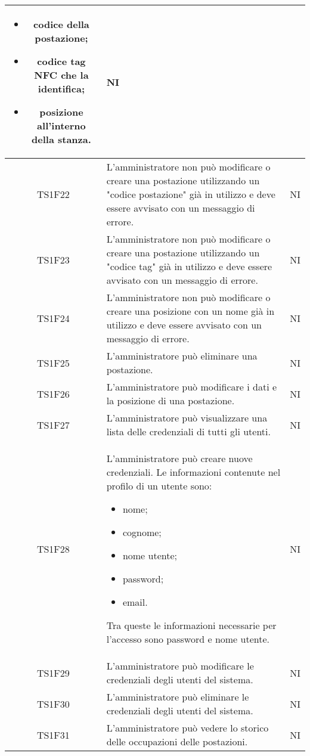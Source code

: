 \begin{center}
\begin{longtable}{|c|p{10cm}|c|}
			\begin{itemize}
				\item codice della postazione;
				\item codice tag NFC che la identifica;
				\item posizione all'interno della stanza.
			\end{itemize}
			& NI \\					
			\hline				
			TS1F22 & L'amministratore non può modificare o creare una postazione utilizzando un "codice postazione" già in utilizzo e deve essere avvisato con un messaggio di errore. & NI \\			
			\hline			
			TS1F23 & L'amministratore non può modificare o creare una postazione utilizzando un "codice tag" già in utilizzo e deve essere avvisato con un messaggio di errore. & NI \\			
			\hline			
			TS1F24 & L'amministratore non può modificare o creare una posizione con un nome già in utilizzo e deve essere avvisato con un messaggio di errore. & NI \\			
			\hline
			TS1F25 & L'amministratore può eliminare una postazione. & NI \\	
			\hline	
			TS1F26 & L'amministratore può modificare i dati e la posizione di una postazione. & NI \\			
			\hline	
			TS1F27 & L'amministratore può visualizzare una lista delle credenziali di tutti gli utenti. & NI \\	
			\hline
			TS1F28 & L'amministratore può creare nuove credenziali. Le informazioni contenute nel profilo di un utente sono:
			\begin{itemize}
				\item nome;
				\item cognome;
				\item nome utente;
				\item password;
				\item email.
			\end{itemize}
			Tra queste le informazioni necessarie per l’accesso sono password e nome utente. & NI \\	
			\hline
			TS1F29 & L’amministratore può modificare le credenziali degli utenti del sistema. & NI \\	
			\hline
			TS1F30 & L’amministratore può eliminare le credenziali degli utenti del sistema. & NI \\	
			\hline
			TS1F31 & L'amministratore può vedere lo storico delle occupazioni delle postazioni. & NI \\	

\end{longtable}
\end{center}
